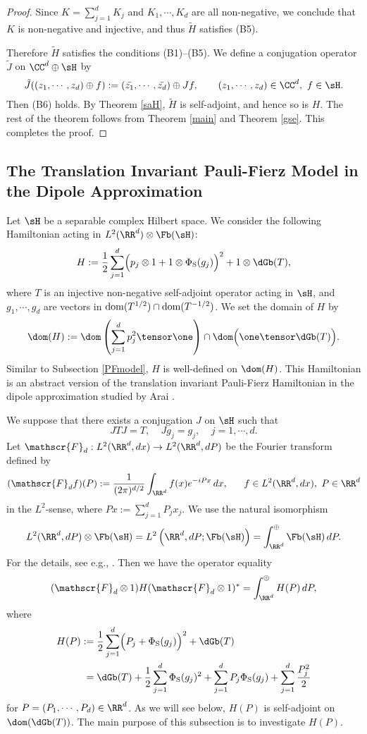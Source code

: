 \documentclass[12pt]{article}
\theoremstyle{plain}
\numberwithin{equation}{section}
\theoremstyle{remark}
\begin{document}
\begin{proof}
Since $K=\sum_{j=1}^dK_j$ and $K_1,\cdots,K_d$ are all non-negative,
we conclude that $K$ is non-negative and injective, and thus $\tilde{H}$ satisfies (B5).

Therefore $\tilde{H}$ satisfies the conditions (B1)--(B5).
We define a conjugation operator $\tilde{J}$ on $\CC^d\oplus\sH$ by
\[
\tilde{J}((z_1,\cdots,z_d)\oplus f):=(\bar{z_1},\cdots,\bar{z_d})\oplus Jf,\qquad (z_1,\cdots,z_d)\in\CC^d,\ f\in\sH.
\]
Then (B6) holds.
By Theorem \ref{saH}, $\tilde{H}$ is self-adjoint, and hence so is $H$. 
The rest of the theorem follows from Theorem \ref{main} and Theorem \ref{gse}.
This completes the proof.
\end{proof}



\subsection{The Translation Invariant Pauli-Fierz Model in the Dipole Approximation}\label{translation PF}
Let $\sH$ be a separable complex Hilbert space.
We consider the following Hamiltonian acting in $L^2(\RR^d)\otimes\Fb(\sH)$: 
\[
H:=\frac{1}{2}\sum_{j=1}^{d}\Bigl(p_j\otimes 1+1\otimes\Phi_{\rm S}(g_j)\Bigr)^2 +1\otimes\dGb(T),
\]
where $T$ is an injective non-negative self-adjoint operator acting in $\sH$,
and $g_1,\cdots,g_d$ are vectors in ${\rm dom}(T^{1/2})\cap{\rm dom}(T^{-1/2})$.
We set the domain of $H$ by
\begin{equation}
 \dom(H) 
 := \dom\left(\sum_{j=1}^d p_j^2\tensor\one\right) \cap \dom\Big( \one\tensor \dGb(T)\Big).  
\end{equation}
Similar to Subsection \ref{PFmodel}, $H$ is well-defined on $\dom(H)$.
This Hamiltonian is an abstract version of the translation invariant Pauli-Fierz Hamiltonian in the dipole approximation studied by Arai \cite{A83b}.

We suppose that there exists a conjugation $J$ on $\sH$ such that 
\[
JTJ=T,\ \ \ \ \ Jg_j=g_j,\ \ \ \ \ j=1,\cdots,d.
\]
Let $\mathscr{F}_d:L^2(\RR^d,dx)\to L^2(\RR^d,dP)$ be the Fourier transform defined by
\[
(\mathscr{F}_df)(P) := \frac{1}{(2\pi)^{d/2}}\int_{\RR^d}f(x)e^{-iPx}\,dx,\ \ \ \ \ f\in L^2(\RR^d,dx),\ P\in\RR^d
\]
in the $L^2$-sense, where $Px:=\sum_{j=1}^dP_jx_j$.
We use the natural isomorphism
\[
L^2(\RR^d,dP)\otimes\Fb(\sH) = L^2\left(\RR^d,dP;\Fb(\sH)\right) = \int_{\RR^d}^\oplus\Fb(\sH)\,dP.
\]
For the details, see e.g., \cite[Section 2.7, 2.8 and 3.11]{A18}.
Then we have the operator equality
\[
(\mathscr{F}_d\otimes1)H(\mathscr{F}_d\otimes1)^*
= \int_{\RR^d}^{\oplus}H(P)\,dP,
\]
where
\begin{align*}
H(P)&:=\frac{1}{2}\sum_{j=1}^{d}\Bigl(P_j+\Phi_{\rm S}(g_j)\Bigr)^2 +\dGb(T)\\
&\phantom{:}=\dGb(T)+\frac{1}{2}\sum_{j=1}^{d}\Phi_{\rm S}(g_j)^2
+\sum_{j=1}^{d}P_j\Phi_{\rm S}(g_j)+\sum_{j=1}^{d}\frac{P_j^2}{2}
\end{align*}
for $P=(P_1,\cdots,P_d)\in\RR^d$.
As we will see below, $H(P)$ is self-adjoint on $\dom(\dGb(T))$.
The main purpose of this subsection is to investigate $H(P)$.
\end{document}
